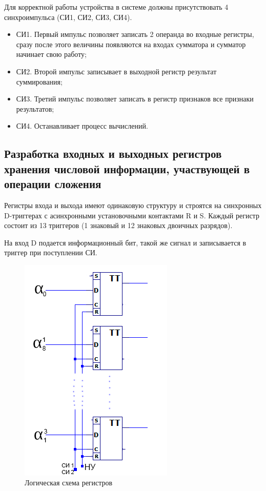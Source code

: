 \documentclass[a4paper,14pt]{article}
\begin{document}
Для корректной работы устройства в системе должны присутствовать 4 синхроимпульса (СИ1, СИ2, СИ3, СИ4).

\begin{itemize}
	\item СИ1. Первый импульс позволяет записать 2 операнда во входные регистры, сразу после этого величины появляются на входах сумматора и сумматор начинает свою работу;
	
	\item СИ2. Второй импульс записывает в выходной регистр результат суммирования;
	
	\item СИ3. Третий импульс позволяет записать в регистр признаков все признаки результатов;
	
	\item СИ4. Останавливает процесс вычислений.
\end{itemize} 

\subsection{Разработка входных и выходных регистров хранения числовой информации, участвующей в операции сложения}

Регистры входа и выхода имеют одинаковую структуру и строятся на синхронных D-триггерах с асинхронными установочными контактами R и S.
Каждый регистр состоит из 13 триггеров (1 знаковый и 12 знаковых двоичных разрядов).

На вход D подается информационный бит, такой же сигнал и записывается в триггер при поступлении СИ.

\begin{figure}[H]
	\centering
	\includegraphics[width=0.4\linewidth]{images/reg}
	\caption{Логическая схема регистров}
	\label{fig:reg}
\end{figure}
\end{document}
